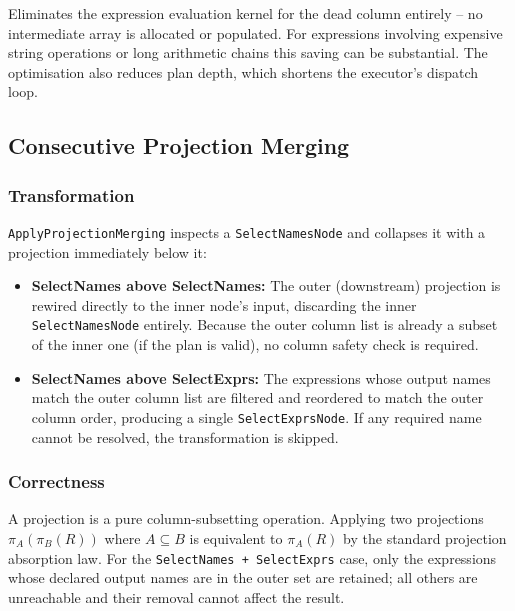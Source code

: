 \documentclass[12pt,a4paper]{article}
\begin{document}
Eliminates the expression evaluation kernel for the dead column entirely --
no intermediate array is allocated or populated.  For expressions involving
expensive string operations or long arithmetic chains this saving can be
substantial.  The optimisation also reduces plan depth, which shortens the
executor's dispatch loop.

\subsection{Consecutive Projection Merging}

\subsubsection*{Transformation}

\texttt{ApplyProjectionMerging} inspects a \texttt{SelectNamesNode} and
collapses it with a projection immediately below it:

\begin{itemize}[leftmargin=1.5em]
  \item \textbf{SelectNames above SelectNames:} The outer (downstream)
        projection is rewired directly to the inner node's input, discarding
        the inner \texttt{SelectNamesNode} entirely.  Because the outer
        column list is already a subset of the inner one (if the plan is
        valid), no column safety check is required.

  \item \textbf{SelectNames above SelectExprs:} The expressions whose
        output names match the outer column list are filtered and reordered
        to match the outer column order, producing a single
        \texttt{SelectExprsNode}.  If any required name cannot be resolved,
        the transformation is skipped.
\end{itemize}

\subsubsection*{Correctness}

A projection is a pure column-subsetting operation.  Applying two
projections $\pi_A(\pi_B(R))$ where $A \subseteq B$ is equivalent to
$\pi_A(R)$ by the standard projection absorption law.  For the
\texttt{SelectNames\,+\,SelectExprs} case, only the expressions whose
declared output names are in the outer set are retained; all others are
unreachable and their removal cannot affect the result.
\end{document}
